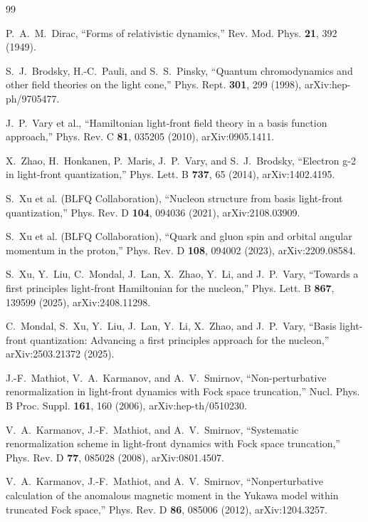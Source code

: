 \documentclass[11pt]{article}
\begin{document}
\small
\begin{thebibliography}{99}

P.~A.~M.~Dirac,
``Forms of relativistic dynamics,''
Rev. Mod. Phys. \textbf{21}, 392 (1949).

S.~J.~Brodsky, H.-C.~Pauli, and S.~S.~Pinsky,
``Quantum chromodynamics and other field theories on the light cone,''
Phys. Rept. \textbf{301}, 299 (1998),
arXiv:hep-ph/9705477.

J.~P.~Vary et al.,
``Hamiltonian light-front field theory in a basis function approach,''
Phys. Rev. C \textbf{81}, 035205 (2010),
arXiv:0905.1411.

X.~Zhao, H.~Honkanen, P.~Maris, J.~P.~Vary, and S.~J.~Brodsky,
``Electron g-2 in light-front quantization,''
Phys. Lett. B \textbf{737}, 65 (2014),
arXiv:1402.4195.

S.~Xu et al. (BLFQ Collaboration),
``Nucleon structure from basis light-front quantization,''
Phys. Rev. D \textbf{104}, 094036 (2021),
arXiv:2108.03909.

S.~Xu et al. (BLFQ Collaboration),
``Quark and gluon spin and orbital angular momentum in the proton,''
Phys. Rev. D \textbf{108}, 094002 (2023),
arXiv:2209.08584.

S.~Xu, Y.~Liu, C.~Mondal, J.~Lan, X.~Zhao, Y.~Li, and J.~P.~Vary,
``Towards a first principles light-front Hamiltonian for the nucleon,''
Phys. Lett. B \textbf{867}, 139599 (2025),
arXiv:2408.11298.

C.~Mondal, S.~Xu, Y.~Liu, J.~Lan, Y.~Li, X.~Zhao, and J.~P.~Vary,
``Basis light-front quantization: Advancing a first principles approach for the
nucleon,''
arXiv:2503.21372 (2025).

J.-F.~Mathiot, V.~A.~Karmanov, and A.~V.~Smirnov,
``Non-perturbative renormalization in light-front dynamics with Fock space
truncation,''
Nucl. Phys. B Proc. Suppl. \textbf{161}, 160 (2006),
arXiv:hep-th/0510230.

V.~A.~Karmanov, J.-F.~Mathiot, and A.~V.~Smirnov,
``Systematic renormalization scheme in light-front dynamics with Fock space
truncation,''
Phys. Rev. D \textbf{77}, 085028 (2008),
arXiv:0801.4507.

V.~A.~Karmanov, J.-F.~Mathiot, and A.~V.~Smirnov,
``Nonperturbative calculation of the anomalous magnetic moment in the Yukawa
model within truncated Fock space,''
Phys. Rev. D \textbf{86}, 085006 (2012),
arXiv:1204.3257.


\end{thebibliography}
\end{document}
